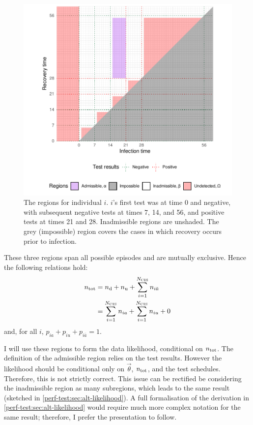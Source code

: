 \documentclass[thesis.tex]{subfiles}
\begin{document}
\begin{figure}
\includegraphics[width=\textwidth]{cis-perfect-testing/regions_diag}
\caption[Admissible, inadmissible, and undetected regions]{%
  The regions for individual $i$.
  $i$'s first test was at time 0 and negative, with subsequent negative tests at times 7, 14, and 56, and positive tests at times 21 and 28.
  Inadmissible regions are unshaded.
  The grey (impossible) region covers the cases in which recovery occurs prior to infection.
  \label{perf-test:fig:partitionSpace}
}
\end{figure}

These three regions span all possible episodes and are mutually exclusive.
Hence the following relations hold:
\begin{align}
n_\text{tot}
&= n_\text{d} + n_\text{u} + \sum_{i=1}^{N_\text{CIS}} n_{i\bar{a}} \\
&= \sum_{i=1}^{N_\text{CIS}} n_{ia} + \sum_{i=1}^{N_\text{CIS}} n_{iu} + 0
\end{align}
and, for all $i$, $p_{ia} + p_{iu} + p_{i\bar{a}} = 1$.

I will use these regions to form the data likelihood, conditional on $n_\text{tot}$.
The definition of the admissible region relies on the test results.
However the likelihood should be conditional only on $\vec{\theta}$, $n_\text{tot}$, and the test schedules.
Therefore, this is not strictly correct.
This issue can be rectified be considering the inadmissible region as many subregions, which leads to the same result (sketched in \cref{perf-test:sec:alt-likelihood}).
A full formalisation of the derivation in \cref{perf-test:sec:alt-likelihood} would require much more complex notation for the same result; therefore, I prefer the presentation to follow.
\end{document}
